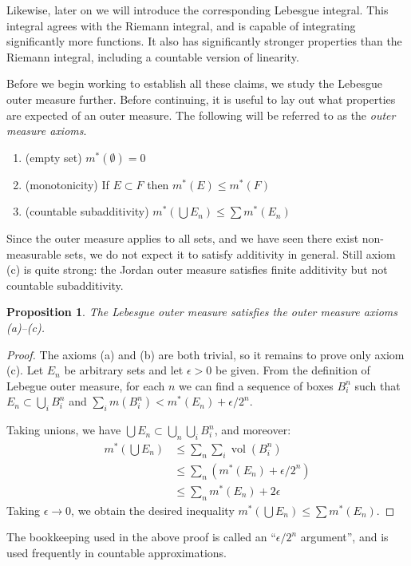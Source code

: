 \documentclass[11pt,oneside]{amsbook}
\DeclareMathOperator{\vol}{vol}
\theoremstyle{definition}
\theoremstyle{plain}
\newtheorem{prop}[thm]{Proposition}
\theoremstyle{definition}
\theoremstyle{remark}
\numberwithin{equation}{section}
\numberwithin{figure}{section}
\begin{document}
Likewise, later on we will introduce the corresponding Lebesgue integral. This integral agrees with the Riemann integral, and is capable of integrating significantly more functions. It also has significantly stronger properties than the Riemann integral, including a countable version of linearity.

Before we begin working to establish all these claims, we study the Lebesgue outer measure further. Before continuing, it is useful to lay out what properties are expected of an outer measure. The following will be referred to as the \emph{outer measure axioms}.
\begin{enumerate}
\item (empty set) $m^*(\emptyset)=0$
\item (monotonicity) If $E\subset F$ then $m^*(E)\leq m^*(F)$
\item (countable subadditivity) $m^*(\bigcup E_n)\leq\sum m^*(E_n)$
\end{enumerate}
Since the outer measure applies to all sets, and we have seen there exist non-measurable sets, we do not expect it to satisfy additivity in general. Still axiom (c) is quite strong: the Jordan outer measure satisfies finite additivity but not countable subadditivity.

\begin{prop}
  The Lebesgue outer measure satisfies the outer measure axioms (a)--(c).
\end{prop}

\begin{proof}
  The axioms (a) and (b) are both trivial, so it remains to prove only axiom (c). Let $E_n$ be arbitrary sets and let $\epsilon>0$ be given. From the definition of Lebegue outer measure, for each $n$ we can find a sequence of boxes $B_i^n$ such that $E_n\subset\bigcup_iB_i^n$ and $\sum_im(B_i^n)<m^*(E_n)+\epsilon/2^n$.

  Taking unions, we have $\bigcup E_n\subset\bigcup_n\bigcup_iB_i^n$, and moreover:
  \begin{align*}
    m^*(\bigcup E_n)&\leq\sum_n\sum_i\vol(B_i^n)\\
                    &\leq\sum_n\left(m^*(E_n)+\epsilon/2^n\right)\\
                    &\leq\sum_nm^*(E_n)+2\epsilon
  \end{align*}
  Taking $\epsilon\to0$, we obtain the desired inequality $m^*(\bigcup E_n)\leq\sum m^*(E_n)$.
\end{proof}

The bookkeeping used in the above proof is called an ``$\epsilon/2^n$ argument'', and is used frequently in countable approximations.
\end{document}
